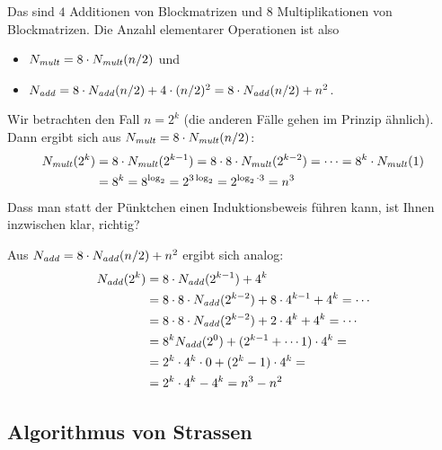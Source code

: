 Das sind $4$ Additionen von Blockmatrizen und $8$ Multiplikationen von
Blockmatrizen. Die Anzahl
elementarer Operationen ist also
\begin{itemize}
\item $N_{\mathit{mult}} = 8 \cdot N_{\mathit{mult}}(n/2)$ und
\item $N_{\mathit{add}} = 8 \cdot N_{\mathit{add}}(n/2) + 4\cdot (n/2)^2 = 8
  \cdot N_{\mathit{add}}(n/2) + n^2$.
\end{itemize}
%
Wir betrachten den Fall $n=2^k$ (die anderen Fälle gehen im Prinzip
ähnlich). Dann ergibt sich aus $N_{\mathit{mult}} = 8 \cdot N_{\mathit{mult}}(n/2)$:
\begin{align*}
  N_{\mathit{mult}}(2^k) &= 8 \cdot N_{\mathit{mult}}(2^{k-1}) = 8 \cdot 8 \cdot N_{\mathit{mult}}(2^{k-2}) = \cdots = 8^k \cdot N_{\mathit{mult}}(1) \\
  &= 8^k = 8^{\log_2} = 2^{3\log_2} = 2^{\log_2\cdot 3} = n^3
\end{align*}
%
Dass man statt der Pünktchen einen Induktionsbeweis führen kann, ist
Ihnen inzwischen klar, richtig?

Aus $N_{\mathit{add}} = 8 \cdot N_{\mathit{add}}(n/2)+n^2$ ergibt sich analog:
\begin{align*}
  N_{\mathit{add}}(2^k) &= 8 \cdot N_{\mathit{add}}(2^{k-1}) + 4^k \\
  &= 8 \cdot 8 \cdot N_{\mathit{add}}(2^{k-2}) + 8\cdot 4^{k-1} + 4^k= \cdots \\
  &= 8 \cdot 8 \cdot N_{\mathit{add}}(2^{k-2}) + 2\cdot 4^k + 4^k= \cdots \\
  &= 8^k N_{\mathit{add}}(2^0) + (2^{k-1}+ \cdots 1)\cdot 4^k =  \\
  &= 2^k\cdot 4^k \cdot 0 + (2^k -1) \cdot 4^k  =  \\
  &= 2^k\cdot 4^k - 4^k = n^3-n^2
\end{align*}

\Tut\subsection{Algorithmus von Strassen}
\label{subsec:strassen}


